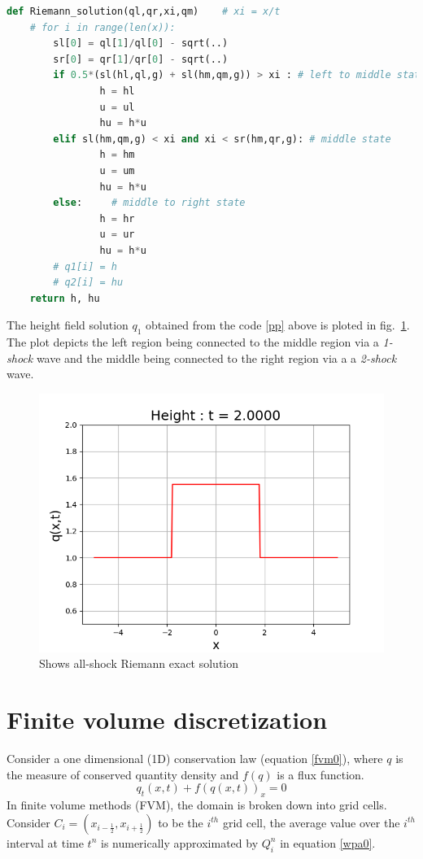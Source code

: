 \documentclass[12pt,a4paper]{article}
\begin{document}
\begin{small}
	\begin{lstlisting}[language=Python, caption=Python code describing how the two shock case solution is obtained after the first time step.,label = pp]
	def Riemann_solution(ql,qr,xi,qm)    # xi = x/t
    # for i in range(len(x)):
        sl[0] = ql[1]/ql[0] - sqrt(..)
        sr[0] = qr[1]/qr[0] - sqrt(..)
		if 0.5*(sl(hl,ql,g) + sl(hm,qm,g)) > xi : # left to middle state
				h = hl
				u = ul
				hu = h*u   	
		elif sl(hm,qm,g) < xi and xi < sr(hm,qr,g): # middle state
				h = hm
				u = um
				hu = h*u
		else:     # middle to right state
				h = hr
				u = ur
				hu = h*u
		# q1[i] = h
		# q2[i] = hu
	return h, hu
\end{lstlisting}
\end{small}

The height field solution $q_1$ obtained from the code \ref{pp} above is ploted in fig.~\ref{fig:2-shock}. The plot depicts the left region being connected to the middle region via a {\em 1-shock } wave and the middle  being connected to the right region via a a {\em 2-shock } wave.

	\begin{figure}[H]
		\centering
		\includegraphics[width=0.5\linewidth]{images/2-shock}
		\caption{Shows all-shock Riemann exact solution }
		\label{fig:2-shock}
	\end{figure}
	

	\section{Finite volume discretization}
	Consider a one dimensional (1D) conservation law  (equation \eqref{fvm0}),  where $q$ is the measure of conserved quantity density and $f(q)$ is a flux function.
	\begin{equation}
		q_{t}(x,t) + f(q(x,t))_{x} = 0
		\label{fvm0}
	\end{equation}	
	  In finite volume methods (FVM), the domain is broken down into grid cells. Consider $C_{i} = (x_{i-\frac{1}{2}},x_{i+\frac{1}{2}})$ to be the $i^{th}$ grid cell, the average value over the $i^{th}$ interval at time $t^{n}$ is numerically approximated by $Q_{i}^{n}$ in equation \eqref{wpa0}.
	
\end{document}
